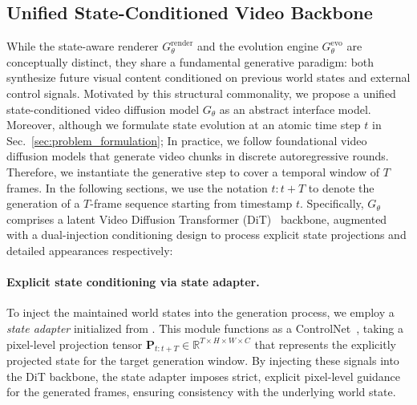 \vspace{-1mm}
\subsection{Unified State-Conditioned Video Backbone}
\label{sec:shared_video_backbone}
While the state-aware renderer $G_{\theta}^\text{render}$ and the evolution engine $G_{\theta}^\text{evo}$ are conceptually distinct, they share a fundamental generative paradigm: both synthesize future visual content conditioned on previous world states and external control signals. Motivated by this structural commonality, we propose a unified state-conditioned video diffusion model $G_{\theta}$ as an abstract interface model. Moreover, although we formulate state evolution at an atomic time step $t$ in Sec.~\ref{sec:problem_formulation}; In practice, we follow foundational video diffusion models\cite{wan, svd, hunyuanvideo} that generate video chunks in discrete autoregressive rounds. Therefore, we instantiate the generative step to cover a temporal window of $T$ frames. In the following sections, we use the notation $t:t+T$ to denote the generation of a $T$-frame sequence starting from timestamp $t$. Specifically, $G_{\theta}$ comprises a latent Video Diffusion Transformer (DiT)~\cite{wan} backbone, augmented with a dual-injection conditioning design to process explicit state projections and detailed appearances respectively:
\paragraph{Explicit state conditioning via state adapter.} To inject the maintained world states into the generation process, we employ a \textit{state adapter} initialized from \cite{vace}. This module functions as a ControlNet~\cite{controlnet}, taking a pixel-level projection tensor $\mathbf{P}_{t:t+T} \in \mathbb{R}^{T \times H \times W \times C}$ that represents the explicitly projected state for the target generation window. By injecting these signals into the DiT backbone, the state adapter imposes strict, explicit pixel-level guidance for the generated frames, ensuring consistency with the underlying world state.

